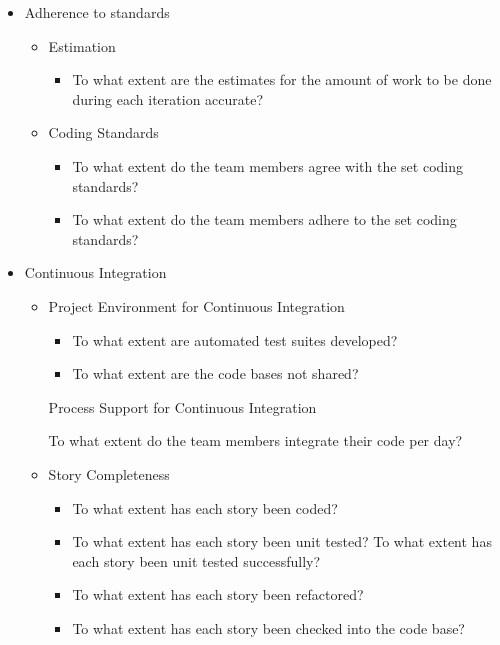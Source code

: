\begin{appendices}
\begin{itemize}
\begin{itemize}
		\end{itemize}
	\item Adherence to standards
		\begin{itemize}
			\item Estimation
				\begin{itemize}
					\item To what extent are the estimates for the amount of work to be done during each iteration accurate?
				\end{itemize}
			\item Coding Standards
				\begin{itemize}
					\item To what extent do the team members agree with the set coding standards? 
					\item To what extent do the team members adhere to the set coding standards?
				\end{itemize}
		\end{itemize}
	\item Continuous Integration
		\begin{itemize}
			\item Project Environment for Continuous Integration 
				\begin{itemize}
					\item To what extent are automated test suites developed?
					\item To what extent are the code bases not shared?
				\end{itemize}
				\begin{itemize}
					\addition Process Support for Continuous Integration
						\begin{itemize}
							\addition To what extent do the team members integrate their code per day?
						\end{itemize}
				\end{itemize}
			\item Story Completeness
				\begin{itemize}
					\item To what extent has each story been coded? 
					\item To what extent has each story been unit tested? 
					\addition To what extent has each story been unit tested successfully?
					\item To what extent has each story been refactored? 
					\item To what extent has each story been checked into the code base? 

\end{itemize}
\end{itemize}
\end{itemize}
\end{appendices}
